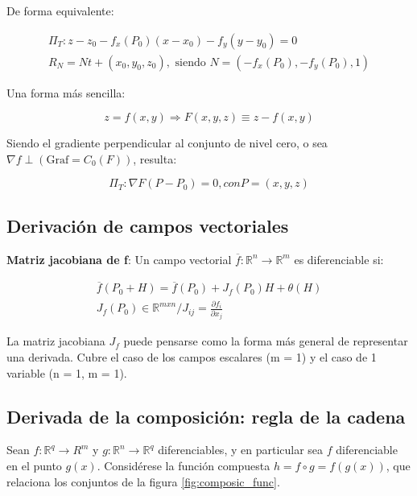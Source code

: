 \documentclass{article}
\renewcommand{\Bbb}{\mathbb}
\begin{document}
De forma equivalente:

\begin{subequations}
\begin{gather}
\Pi_T: z-z_0 - f_x(P_0) (x-x_0) - f_y (y-y_0) = 0 \\
R_N = N t + (x_0, y_0, z_0), \text{ siendo } N = (-f_x(P_0), -f_y(P_0), 1)
\end{gather}
\end{subequations}

Una forma más sencilla:

\begin{equation}
z = f(x,y) \Rightarrow F(x,y,z) \equiv z - f(x,y)
\end{equation}

Siendo el gradiente perpendicular al conjunto de nivel cero, o sea $\nabla{f} \perp (\text{Graf} = C_0(F))$, resulta:

\begin{equation}
\Pi_T: \nabla{F} (P - P_0) = 0, { con } P = (x,y,z)
\end{equation}

\subsection{Derivación de campos vectoriales}

\textbf{Matriz jacobiana de f}: Un campo vectorial $\overline{f}: \Bbb R^n \rightarrow \Bbb R^m$ es diferenciable si:

\begin{subequations}
\begin{gather}
\overline{f}(P_0 + H) = \overline{f}(P_0) + J_f(P_0) H + \theta(H) \\
J_f(P_0) \in \Bbb R^{m x n} / J_{ij} = \frac{\partial f_i}{\partial x_j} 
\end{gather}
\end{subequations}

La matriz jacobiana $J_f$ puede pensarse como la forma más general de representar una derivada. Cubre el caso de los campos escalares (m = 1) y el caso de 1 variable (n = 1, m = 1).

\subsection{Derivada de la composición: regla de la cadena}

Sean $f:\Bbb R^q \rightarrow R^m$ y $g:\Bbb R^n \rightarrow \Bbb R^q$ diferenciables, y en particular sea $f$ diferenciable en el punto $g(x)$. Considérese la función compuesta $h = f \circ g = f(g(x))$, que relaciona los conjuntos de la figura \ref{fig:composic_func}.
\end{document}

